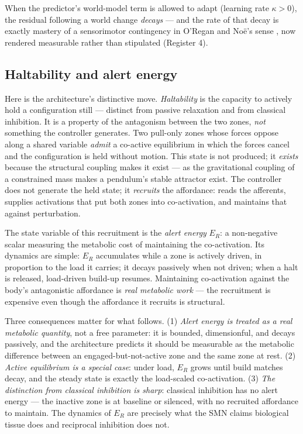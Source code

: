 \documentclass[utf8]{FrontiersinHarvard} %
\begin{document}
When the predictor's world-model term is allowed to adapt (learning rate $\kappa>0$), the residual following a world change \emph{decays} --- and the rate of that decay is exactly mastery of a sensorimotor contingency in O'Regan and No\"e's sense \citep{OReganNoe2001Sensorimotor}, now rendered measurable rather than stipulated (Register 4).

\subsection{Haltability and alert energy}\label{sec:haltability}
Here is the architecture's distinctive move. \emph{Haltability} is the capacity to actively hold a configuration still --- distinct from passive relaxation and from classical inhibition. It is a property of the antagonism between the two zones, \emph{not} something the controller generates. Two pull-only zones whose forces oppose along a shared variable \emph{admit} a co-active equilibrium in which the forces cancel and the configuration is held without motion. This state is not produced; it \emph{exists} because the structural coupling makes it exist --- as the gravitational coupling of a constrained mass makes a pendulum's stable attractor exist. The controller does not generate the held state; it \emph{recruits} the affordance: reads the afferents, supplies activations that put both zones into co-activation, and maintains that against perturbation.

The state variable of this recruitment is the \emph{alert energy} $E_R$: a non-negative scalar measuring the metabolic cost of maintaining the co-activation. Its dynamics are simple: $E_R$ accumulates while a zone is actively driven, in proportion to the load it carries; it decays passively when not driven; when a halt is released, load-driven build-up resumes. Maintaining co-activation against the body's antagonistic affordance is \emph{real metabolic work} --- the recruitment is expensive even though the affordance it recruits is structural.

Three consequences matter for what follows. (1) \emph{Alert energy is treated as a real metabolic quantity}, not a free parameter: it is bounded, dimensionful, and decays passively, and the architecture predicts it should be measurable as the metabolic difference between an engaged-but-not-active zone and the same zone at rest. (2) \emph{Active equilibrium is a special case}: under load, $E_R$ grows until build matches decay, and the steady state is exactly the load-scaled co-activation. (3) \emph{The distinction from classical inhibition is sharp}: classical inhibition has no alert energy --- the inactive zone is at baseline or silenced, with no recruited affordance to maintain. The dynamics of $E_R$ are precisely what the SMN claims biological tissue does and reciprocal inhibition does not.
\end{document}
